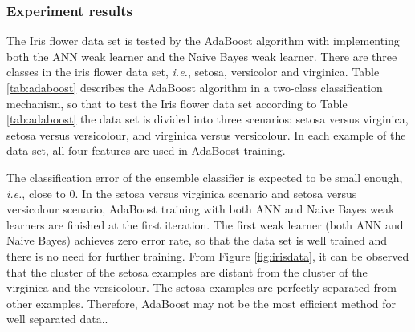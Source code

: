 \subsubsection{Experiment results}
\label{sec:expiris}
The Iris flower data set is tested by the AdaBoost algorithm with implementing both the ANN weak learner and the Naive Bayes weak learner. There are three classes in the iris flower data set, \textit{i.e.}, setosa, versicolor and virginica. \mbox{Table} \ref{tab:adaboost} describes the AdaBoost algorithm in a two-class classification mechanism, so that to test the Iris flower data set according to \mbox{Table} \ref{tab:adaboost} the data set is divided into three scenarios: setosa versus virginica, setosa versus versicolour, and virginica versus versicolour. In each example of the data set, all four features are used in AdaBoost training.

The classification error of the ensemble classifier is expected to be small enough, \textit{i.e.}, close to $0$. In the setosa versus virginica scenario and setosa versus versicolour scenario, AdaBoost training with both ANN and Naive Bayes weak learners are finished at the first iteration. The first weak learner (both ANN and Naive Bayes) achieves zero error rate, so that the data set is well trained and there is no need for further training. From \mbox{Figure} \ref{fig:irisdata}, it can be observed that the cluster of the setosa examples are distant from the cluster of the virginica and the versicolour. The setosa examples are perfectly separated from other examples. Therefore, AdaBoost may not be the most efficient method for well separated data..

